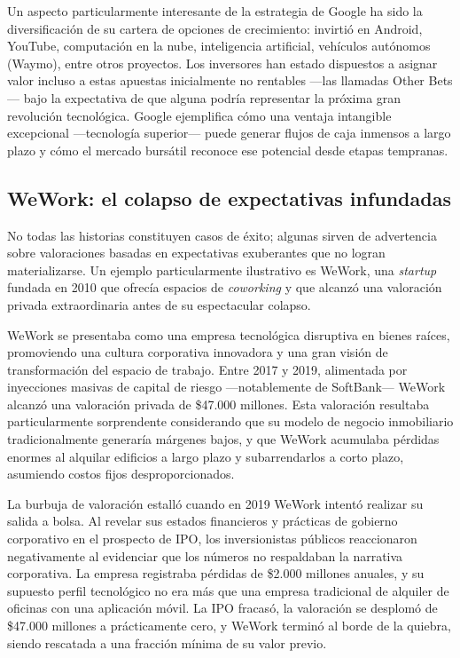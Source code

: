 Un aspecto particularmente interesante de la estrategia de Google ha sido la diversificación de su cartera de opciones de crecimiento: invirtió en Android, YouTube, computación en la nube, inteligencia artificial, vehículos autónomos (Waymo), entre otros proyectos. Los inversores han estado dispuestos a asignar valor incluso a estas apuestas inicialmente no rentables ---las llamadas Other Bets--- bajo la expectativa de que alguna podría representar la próxima gran revolución tecnológica. Google ejemplifica cómo una ventaja intangible excepcional ---tecnología superior--- puede generar flujos de caja inmensos a largo plazo y cómo el mercado bursátil reconoce ese potencial desde etapas tempranas.

\subsection{WeWork: el colapso de expectativas infundadas}

No todas las historias constituyen casos de éxito; algunas sirven de advertencia sobre valoraciones basadas en expectativas exuberantes que no logran materializarse. Un ejemplo particularmente ilustrativo es WeWork, una \emph{startup} fundada en 2010 que ofrecía espacios de \emph{coworking} y que alcanzó una valoración privada extraordinaria antes de su espectacular colapso.

WeWork se presentaba como una empresa tecnológica disruptiva en bienes raíces, promoviendo una cultura corporativa innovadora y una gran visión de transformación del espacio de trabajo. Entre 2017 y 2019, alimentada por inyecciones masivas de capital de riesgo ---notablemente de SoftBank--- WeWork alcanzó una valoración privada de \$47.000 millones. Esta valoración resultaba particularmente sorprendente considerando que su modelo de negocio inmobiliario tradicionalmente generaría márgenes bajos, y que WeWork acumulaba pérdidas enormes al alquilar edificios a largo plazo y subarrendarlos a corto plazo, asumiendo costos fijos desproporcionados.

La burbuja de valoración estalló cuando en 2019 WeWork intentó realizar su salida a bolsa. Al revelar sus estados financieros y prácticas de gobierno corporativo en el prospecto de IPO, los inversionistas públicos reaccionaron negativamente al evidenciar que los números no respaldaban la narrativa corporativa. La empresa registraba pérdidas de \$2.000 millones anuales, y su supuesto perfil tecnológico no era más que una empresa tradicional de alquiler de oficinas con una aplicación móvil. La IPO fracasó, la valoración se desplomó de \$47.000 millones a prácticamente cero, y WeWork terminó al borde de la quiebra, siendo rescatada a una fracción mínima de su valor previo.

